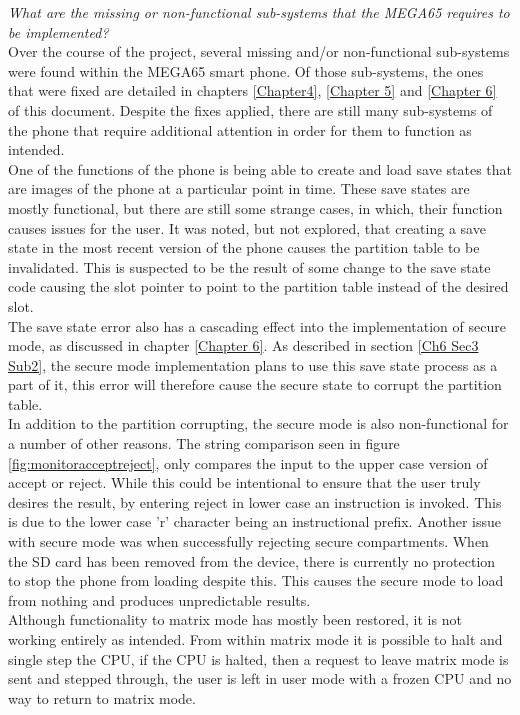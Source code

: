 \textit{What are the missing or non-functional sub-systems that the MEGA65 requires to be implemented?}\\
Over the course of the project, several missing and/or non-functional sub-systems were found within the MEGA65 smart phone. 
Of those sub-systems, the ones that were fixed are detailed in chapters \ref{Chapter4}, \ref{Chapter 5} and \ref{Chapter 6} of this document. 
Despite the fixes applied, there are still many sub-systems of the phone that require additional attention in order for them to function as intended.\\
One of the functions of the phone is being able to create and load save states that are images of the phone at a particular point in time. 
These save states are mostly functional, but there are still some strange cases, in which, their function causes issues for the user. 
It was noted, but not explored, that creating a save state in the most recent version of the phone causes the partition table to be invalidated. 
This is suspected to be the result of some change to the save state code causing the slot pointer to point to the partition table instead of the desired slot.\\
The save state error also has a cascading effect into the implementation of secure mode, as discussed in chapter \ref{Chapter 6}. 
As described in section \ref{Ch6 Sec3 Sub2}, the secure mode implementation plans to use this save state process as a part of it, this error will therefore cause the secure state to corrupt the partition table.\\
In addition to the partition corrupting, the secure mode is also non-functional for a number of other reasons. 
The string comparison seen in figure \ref{fig:monitoracceptreject}, only compares the input to the upper case version of accept or reject. 
While this could be intentional to ensure that the user truly desires the result, by entering reject in lower case an instruction is invoked. 
This is due to the lower case 'r' character being an instructional prefix. 
Another issue with secure mode was when successfully rejecting secure compartments. When the SD card has been removed from the device, there is currently no protection to stop the phone from loading despite this.
This causes the secure mode to load from nothing and produces unpredictable results.\\
Although functionality to matrix mode has mostly been restored, it is not working entirely as intended. 
From within matrix mode it is possible to halt and single step the CPU, if the CPU is halted, then a request to leave matrix mode is sent and stepped through, the user is left in user mode with a frozen CPU and no way to return to matrix mode.
